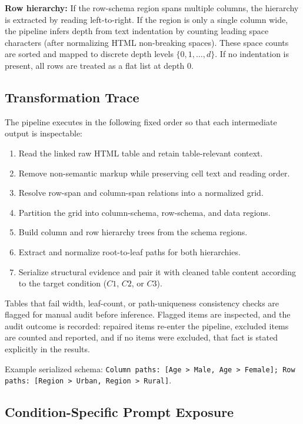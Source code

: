 ﻿\documentclass[a4paper]{article}
\begin{document}
\textbf{Row hierarchy:} If the row-schema region spans multiple columns, the hierarchy is extracted by reading left-to-right. If the region is only a single column wide, the pipeline infers depth from text indentation by counting leading space characters (after normalizing HTML non-breaking spaces). These space counts are sorted and mapped to discrete depth levels $\{0, 1, \ldots, d\}$. If no indentation is present, all rows are treated as a flat list at depth 0.

\subsection{Transformation Trace}

The pipeline executes in the following fixed order so that each intermediate output is inspectable:
\begin{enumerate}
\item Read the linked raw HTML table and retain table-relevant context.
\item Remove non-semantic markup while preserving cell text and reading order.
\item Resolve row-span and column-span relations into a normalized grid.
\item Partition the grid into column-schema, row-schema, and data regions.
\item Build column and row hierarchy trees from the schema regions.
\item Extract and normalize root-to-leaf paths for both hierarchies.
\item Serialize structural evidence and pair it with cleaned table content according to the target condition (\(C1\), \(C2\), or \(C3\)).
\end{enumerate}

Tables that fail width, leaf-count, or path-uniqueness consistency checks are flagged for manual audit before inference. Flagged items are inspected, and the audit outcome is recorded: repaired items re-enter the pipeline, excluded items are counted and reported, and if no items were excluded, that fact is stated explicitly in the results.

Example serialized schema: \texttt{Column paths: [Age > Male, Age > Female]; Row paths: [Region > Urban, Region > Rural]}.

\subsection{Condition-Specific Prompt Exposure}
\end{document}
